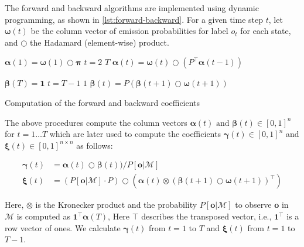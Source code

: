 The forward and backward algorithms are implemented using dynamic programming, as shown in \autoref{lst:forward-backward}.
For a given time step $t$, let $\pmb{\omega}(t)$ be the column vector of emission probabilities for label $o_t$ for each state, and $\bigcirc$ the Hadamard (element-wise) product.

\begin{listing}[htb!]
    \begin{codebox}
        \li $\pmb{\alpha}(1) = \pmb{\omega}(1) \bigcirc \pmb{\pi}$
        \li \For $t = 2$ \To $T$ \Do
        \li $\pmb{\alpha}(t) = \pmb{\omega}(t) \bigcirc \left( P^\top \pmb{\alpha}(t-1) \right)$
        \End
    \end{codebox}
    \begin{codebox}
        \li $\pmb{\beta}(T) = \mathbf{1}$
        \li \For $t = T-1$ \To $1$ \Do
        \li $\pmb{\beta}(t) = P \left( \pmb{\beta}(t+1) \bigcirc \pmb{\omega}(t+1) \right)$
        \End
    \end{codebox}
    \caption{Computation of the forward and backward coefficients}
    \label{lst:forward-backward}
\end{listing}

The above procedures compute the column vectors $\pmb{\alpha}(t) \text{ and } \pmb{\beta}(t) \in [0,1]^{n}$ for $t = 1\dots T$ which are later used to compute the coefficients $\pmb{\gamma}(t) \in [0,1]^{n}$ and $\pmb{\xi}(t) \in [0,1]^{n \times n}$ as follows:

\begin{align*}
    \pmb{\gamma}(t) & = \pmb{\alpha}(t) \bigcirc \pmb{\beta}(t)) / P[\mathbf{o} | \mathcal{M}]                                                                   \\%
    \pmb{\xi}(t)    & = (P[\mathbf{o} | \mathcal{M}] \cdot P) \bigcirc \left( \pmb{\alpha}(t) \otimes (\pmb{\beta}(t+1) \bigcirc \pmb{\omega}(t+1))^\top \right) %
\end{align*}

Here, $\otimes$ is the Kronecker product and the probability $P[\mathbf{o} | \mathcal{M}]$ to observe $\mathbf{o}$ in $\mathcal{M}$ is computed as $\mathbf{1}^\top \pmb{\alpha}(T)$, Here $\top$ describes the transposed vector, i.e., $\mathbf{1}^\top$ is a row vector of ones.
We calculate $\pmb{\gamma}(t)$ from $t= 1$ to $T$ and $\pmb{\xi}(t)$ from $t= 1$ to $T-1$.

